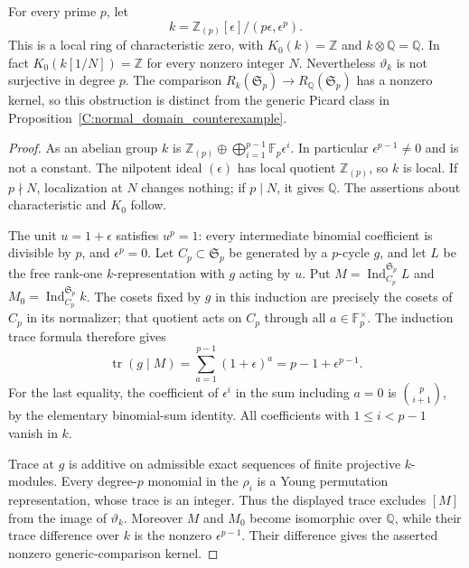 \begin{proposition}
\label{C:torsion_generic_kernel}
For every prime $p$, let
\[
 k=\mathbb Z_{(p)}[\epsilon]/(p\epsilon,\epsilon^p).
\]
This is a local ring of characteristic zero, with $K_0(k)=\mathbb Z$ and
$k\otimes\mathbb Q=\mathbb Q$. In fact $K_0(k[1/N])=\mathbb Z$ for
every nonzero integer $N$. Nevertheless $\vartheta_k$ is not surjective
in degree $p$. The comparison
$R_k(\mathfrak S_p)\to R_{\mathbb Q}(\mathfrak S_p)$ has a nonzero
kernel, so this obstruction is distinct from the generic Picard class in
Proposition~\ref{C:normal_domain_counterexample}.
\end{proposition}
\begin{proof}
As an abelian group $k$ is
$\mathbb Z_{(p)}\oplus\bigoplus_{i=1}^{p-1}\mathbb F_p\epsilon^i$.
In particular $\epsilon^{p-1}\ne0$ and is not a constant. The nilpotent
ideal $(\epsilon)$ has local quotient $\mathbb Z_{(p)}$, so $k$ is local.
If $p\nmid N$, localization at $N$ changes nothing; if $p\mid N$, it
gives $\mathbb Q$. The assertions about characteristic and $K_0$ follow.

The unit $u=1+\epsilon$ satisfies $u^p=1$: every intermediate binomial
coefficient is divisible by $p$, and $\epsilon^p=0$. Let $C_p\subset
\mathfrak S_p$ be generated by a $p$-cycle $g$, and let $L$ be the free
rank-one $k$-representation with $g$ acting by $u$. Put
$M=\operatorname{Ind}_{C_p}^{\mathfrak S_p}L$ and
$M_0=\operatorname{Ind}_{C_p}^{\mathfrak S_p}k$. The cosets fixed by $g$
in this induction are precisely the cosets of $C_p$ in its normalizer;
that quotient acts on $C_p$ through all $a\in\mathbb F_p^\times$.
The induction trace formula therefore gives
\[
 \operatorname{tr}(g\mid M)
   =\sum_{a=1}^{p-1}(1+\epsilon)^a
   =p-1+\epsilon^{p-1}.
\]
For the last equality, the coefficient of $\epsilon^i$ in the sum
including $a=0$ is $\binom p{i+1}$, by the elementary binomial-sum
identity. All coefficients with $1\leq i<p-1$ vanish in $k$.

Trace at $g$ is additive on admissible exact sequences of finite
projective $k$-modules. Every degree-$p$ monomial in the $\rho_i$ is a
Young permutation representation, whose trace is an integer. Thus the
displayed trace excludes $[M]$ from the image of $\vartheta_k$.
Moreover $M$ and $M_0$ become isomorphic over $\mathbb Q$, while their
trace difference over $k$ is the nonzero $\epsilon^{p-1}$. Their
difference gives the asserted nonzero generic-comparison kernel.


\end{proof}
